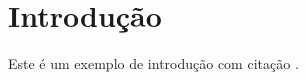 \chapter{Introdução}
\label{cap:intro}

Este é um exemplo de introdução com citação \cite{Arm1979}.

